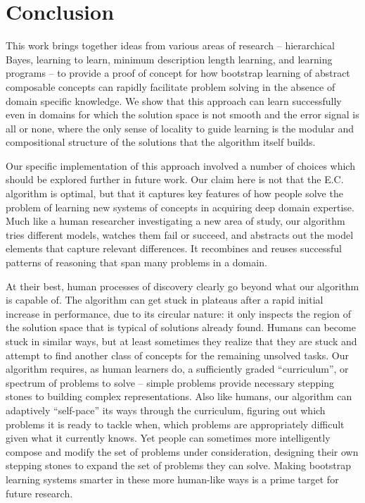 \documentclass{article}
\begin{document}
\section{Conclusion}
This work brings together ideas from various areas of research --
hierarchical Bayes, learning to learn, minimum description length
learning, and learning programs -- to provide a proof of concept for
how bootstrap learning of abstract composable concepts can rapidly
facilitate problem solving in the absence of domain specific
knowledge. We show that this approach can learn successfully even in
domains for which the solution space is not smooth and the error
signal is all or none, where the only sense of locality to guide
learning is the modular and compositional structure of the solutions
that the algorithm itself builds.

Our specific implementation of this approach involved a number of
choices which should be explored further in future work.  Our claim
here is not that the E.C. algorithm is optimal, but that it captures key
features of how people solve the problem of learning new systems of
concepts in acquiring deep domain expertise.  Much like a human
researcher investigating a new area of study, our algorithm tries
different models, watches them fail or succeed, and abstracts out the
model elements that capture relevant differences.  It recombines and
reuses successful patterns of reasoning that span many problems in a
domain.

At their best, human processes of discovery clearly go beyond
what our algorithm is capable of.  The algorithm can get stuck in
plateaus after a rapid initial increase in performance, due to its
circular nature: it only inspects the region of the solution space
that is typical of solutions already found.  Humans can become stuck
in similar ways, but at least sometimes they realize that they are
stuck and attempt to find another class of concepts for the remaining
unsolved tasks.  Our algorithm requires, as human learners do, a
sufficiently graded ``curriculum'', or spectrum of problems to solve --
simple problems provide necessary stepping stones to building complex
representations.  Also like humans, our algorithm can adaptively
``self-pace'' its ways through the curriculum, figuring out which
problems it is ready to tackle when, which problems are appropriately
difficult given what it currently knows.  Yet people can sometimes
more intelligently compose and modify the set of problems under
consideration, designing their own stepping stones to expand the set
of problems they can solve.  Making bootstrap learning systems smarter
in these more human-like ways is a prime target for future research.
\end{document}
